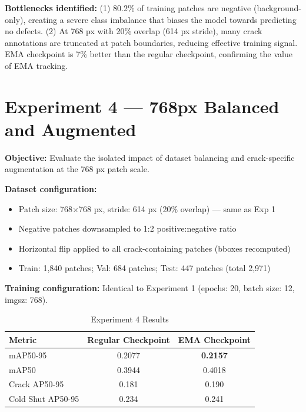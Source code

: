 \begin{findingbox}
\textbf{Bottlenecks identified:} (1) 80.2\% of training patches are negative (background-only), creating a severe class imbalance that biases the model towards predicting no defects. (2) At 768 px with 20\% overlap (614 px stride), many crack annotations are truncated at patch boundaries, reducing effective training signal. EMA checkpoint is 7\% better than the regular checkpoint, confirming the value of EMA tracking.
\end{findingbox}

\section{Experiment 4 --- 768px Balanced and Augmented}

\textbf{Objective:} Evaluate the isolated impact of dataset balancing and crack-specific augmentation at the 768 px patch scale.

\textbf{Dataset configuration:}
\begin{itemize}[leftmargin=2em]
    \item Patch size: 768$\times$768 px, stride: 614 px (20\% overlap) --- same as Exp 1
    \item Negative patches downsampled to 1:2 positive:negative ratio
    \item Horizontal flip applied to all crack-containing patches (bboxes recomputed)
    \item Train: 1,840 patches; Val: 684 patches; Test: 447 patches (total 2,971)
\end{itemize}

\textbf{Training configuration:} Identical to Experiment 1 (epochs: 20, batch size: 12, imgsz: 768).

\begin{table}[H]
\centering
\caption{Experiment 4 Results}
\begin{tabular}{lcc}
\toprule
\rowcolor{tableHeader}\tableheadfont Metric & \tableheadfont Regular Checkpoint & \tableheadfont EMA Checkpoint \\
\midrule
mAP50-95          & 0.2077 & \textbf{0.2157} \\
\rowcolor{tableRowAlt}mAP50             & 0.3944 & 0.4018 \\
Crack AP50-95     & 0.181  & 0.190 \\
\rowcolor{tableRowAlt}Cold Shut AP50-95 & 0.234  & 0.241 \\
\bottomrule
\end{tabular}
\end{table}

